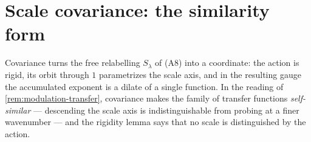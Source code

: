 %
%
%
%

\chapter{Scale covariance: the similarity form}
\label{ch:covariance}

Covariance turns the free relabelling $S_\lambda$ of (A8) into a coordinate: the action is
rigid, its orbit through $1$ parametrizes the scale axis, and in the resulting gauge the
accumulated exponent is a dilate of a single function. In the reading of
\ref{rem:modulation-transfer}, covariance makes the family of transfer functions
\emph{self-similar} --- descending the scale axis is indistinguishable from probing at a finer
wavenumber --- and the rigidity lemma says that no scale is distinguished by the action.

